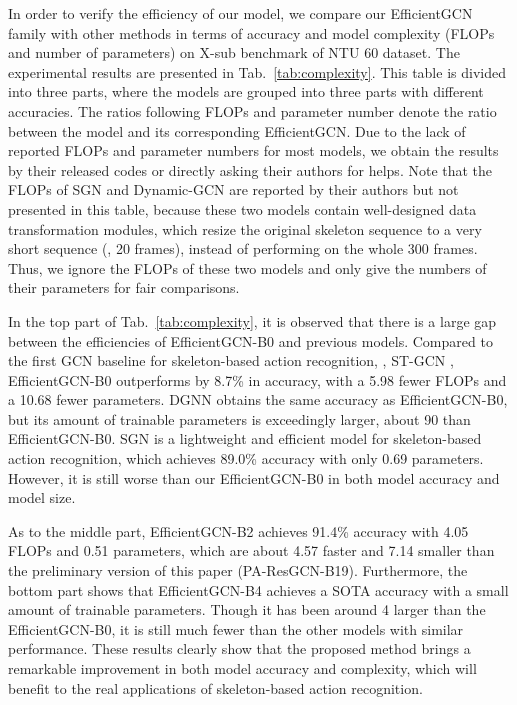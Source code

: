 \documentclass[10pt,journal,compsoc]{IEEEtran}
\begin{document}
In order to verify the efficiency of our model, we compare our EfficientGCN family with other methods in terms of accuracy and model complexity (FLOPs and number of parameters) on X-sub benchmark of NTU 60 dataset. The experimental results are presented in Tab.~\ref{tab:complexity}. This table is divided into three parts, where the models are grouped into three parts with different accuracies. The ratios following FLOPs and parameter number denote the ratio between the model and its corresponding EfficientGCN. Due to the lack of reported FLOPs and parameter numbers for most models, we obtain the results by their released codes or directly asking their authors for helps. Note that the FLOPs of SGN \cite{zhang2020semantics} and Dynamic-GCN \cite{ye2020dynamic} are reported by their authors but not presented in this table, because these two models contain well-designed data transformation modules, which resize the original skeleton sequence to a very short sequence (\eg, 20 frames), instead of performing on the whole 300 frames. Thus, we ignore the FLOPs of these two models and only give the numbers of their parameters for fair comparisons.

In the top part of Tab.~\ref{tab:complexity}, it is observed that there is a large gap between the efficiencies of EfficientGCN-B0 and previous models. Compared to the first GCN baseline for skeleton-based action recognition, \ie, ST-GCN \cite{yan2018spatial}, EfficientGCN-B0 outperforms by 8.7\% in accuracy, with a 5.98 fewer FLOPs and a 10.68 fewer parameters. DGNN \cite{shi2019skeleton} obtains the same accuracy as EfficientGCN-B0, but its amount of trainable parameters is exceedingly larger, about 90 than EfficientGCN-B0. SGN \cite{zhang2020semantics} is a lightweight and efficient model for skeleton-based action recognition, which achieves 89.0\% accuracy with only 0.69 parameters. However, it is still worse than our EfficientGCN-B0 in both model accuracy and model size.

As to the middle part, EfficientGCN-B2 achieves 91.4\% accuracy with 4.05 FLOPs and 0.51 parameters, which are about 4.57 faster and 7.14 smaller than the preliminary version of this paper (PA-ResGCN-B19). Furthermore, the bottom part shows that EfficientGCN-B4 achieves a SOTA accuracy with a small amount of trainable parameters. Though it has been around 4 larger than the EfficientGCN-B0, it is still much fewer than the other models with similar performance. These results clearly show that the proposed method brings a remarkable improvement in both model accuracy and complexity, which will benefit to the real applications of skeleton-based action recognition.
\end{document}

